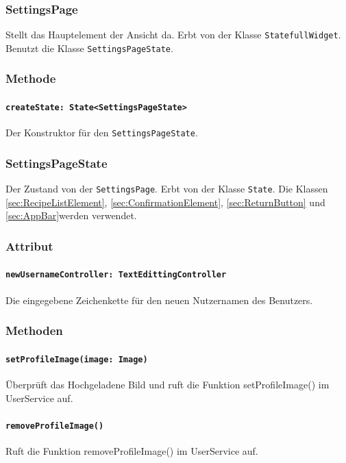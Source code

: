 \documentclass{entwurfsheft}
\begin{document}
    \subsubsection{SettingsPage}
        Stellt das Hauptelement der Ansicht da. Erbt von der Klasse \texttt{StatefullWidget}. Benutzt die Klasse \texttt{SettingsPageState}.
        \subsubsection*{Methode}
            \paragraph*{\texttt{createState: State<SettingsPageState>}} Der Konstruktor für den \texttt{SettingsPageState}.
    
    \subsubsection{SettingsPageState}
        Der Zustand von der \texttt{SettingsPage}. Erbt von der Klasse \texttt{State}. Die Klassen \ref{sec:RecipeListElement}, \ref{sec:ConfirmationElement}, \ref{sec:ReturnButton} und \ref{sec:AppBar}werden verwendet.
        \subsubsection*{Attribut}
            \paragraph*{\texttt{newUsernameController: TextEdittingController}} Die eingegebene Zeichenkette für den neuen Nutzernamen des Benutzers.

        \subsubsection*{Methoden}
            \paragraph*{\texttt{setProfileImage(image: Image)}} Überprüft das Hochgeladene Bild und ruft die Funktion setProfileImage() im UserService auf.
            \paragraph*{\texttt{removeProfileImage()}} Ruft die Funktion removeProfileImage() im UserService auf.
\end{document}

